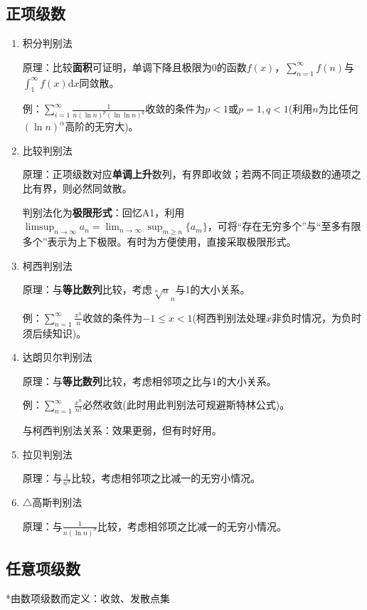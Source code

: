 \documentclass[a4paper,UTF8]{ctexart}
\begin{document}
\subsection{正项级数}
\begin{enumerate}
\item 积分判别法

原理：比较\textbf{面积}可证明，单调下降且极限为0的函数$f(x)$，$\sum_{n=1}^\infty f(n)$与$\int_1^\infty f(x)\mathrm{d}x$同敛散。

例：$\sum_{i=1}^\infty\frac{1}{n(\ln n)^p(\ln\ln n)^q}$收敛的条件为$p<1$或$p=1,q<1$(利用$n$为比任何$(\ln n)^\alpha$高阶的无穷大)。

\item 比较判别法

原理：正项级数对应\textbf{单调上升}数列，有界即收敛；若两不同正项级数的通项之比有界，则必然同敛散。

判别法化为\textbf{极限形式}：回忆A1，利用$\limsup_{n\to\infty}a_n=\lim_{n\to\infty}\sup_{m\ge n}\{a_m\}$，可将“存在无穷多个”与“至多有限多个”表示为上下极限。有时为方便使用，直接采取极限形式。

\item 柯西判别法

原理：与\textbf{等比数列}比较，考虑$\sqrt[n]a_n$与1的大小关系。

例：$\sum_{n=1}^\infty\frac{x^n}{n}$收敛的条件为$-1\le x<1$(柯西判别法处理$x$非负时情况，为负时须后续知识)。

\item 达朗贝尔判别法

原理：与\textbf{等比数列}比较，考虑相邻项之比与1的大小关系。

例：$\sum_{n=1}^\infty\frac{x^n}{n!}$必然收敛(此时用此判别法可规避斯特林公式)。

与柯西判别法关系：效果更弱，但有时好用。

\item 拉贝判别法

原理：与$\frac{1}{n^\sigma}$比较，考虑相邻项之比减一的无穷小情况。

\item $\triangle$高斯判别法

原理：与$\frac{1}{n(\ln n)^\sigma}$比较，考虑相邻项之比减一的无穷小情况。
\end{enumerate}

\subsection{任意项级数}
*由数项级数而定义：收敛、发散点集
\end{document}
